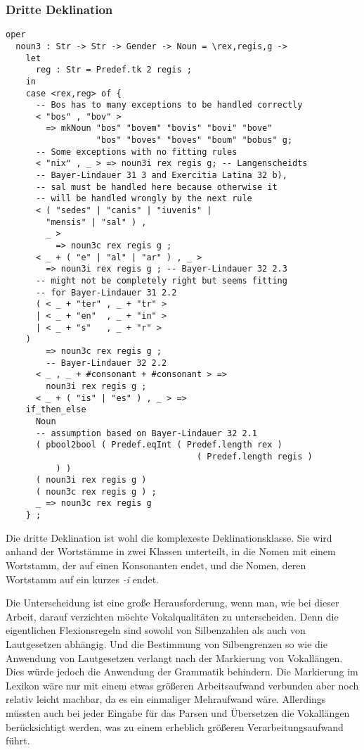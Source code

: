 \subsubsection{Dritte Deklination}
\begin{lstlisting}[float=h!tp,caption={Funktion zur Zuordnung von Nomen zu den Stämmen der dritten Deklination (vgl. \textbf{MorphoLat.gf})},label={GF-Morpho-Noun3},basicstyle=\small]
oper
  noun3 : Str -> Str -> Gender -> Noun = \rex,regis,g ->
    let
      reg : Str = Predef.tk 2 regis ;
    in
    case <rex,reg> of {
      -- Bos has to many exceptions to be handled correctly
      < "bos" , "bov" > 
        => mkNoun "bos" "bovem" "bovis" "bovi" "bove" 
                  "bos" "boves" "boves" "boum" "bobus" g;
      -- Some exceptions with no fitting rules
      < "nix" , _ > => noun3i rex regis g; -- Langenscheidts
      -- Bayer-Lindauer 31 3 and Exercitia Latina 32 b), 
      -- sal must be handled here because otherwise it 
      -- will be handled wrongly by the next rule 
      < ( "sedes" | "canis" | "iuvenis" |
        "mensis" | "sal" ) , 
        _ >
          => noun3c rex regis g ;  
      < _ + ( "e" | "al" | "ar" ) , _ > 
        => noun3i rex regis g ; -- Bayer-Lindauer 32 2.3
      -- might not be completely right but seems fitting
      -- for Bayer-Lindauer 31 2.2 
      ( < _ + "ter" , _ + "tr" >
      | < _ + "en"  , _ + "in" >
      | < _ + "s"   , _ + "r" > 
	) 
        => noun3c rex regis g ; 
        -- Bayer-Lindauer 32 2.2
      < _ , _ + #consonant + #consonant > => 
        noun3i rex regis g ; 
      < _ + ( "is" | "es" ) , _ > => 
	if_then_else 
	  Noun 
	  -- assumption based on Bayer-Lindauer 32 2.1
	  ( pbool2bool ( Predef.eqInt ( Predef.length rex ) 
                                      ( Predef.length regis ) 
          ) ) 
	  ( noun3i rex regis g ) 
	  ( noun3c rex regis g ) ;
      _ => noun3c rex regis g
    } ;
\end{lstlisting}
Die dritte Deklination ist wohl die komplexeste Deklinationsklasse. Sie wird anhand der Wortstämme in zwei Klassen unterteilt, in die Nomen mit einem Wortstamm, der auf einen Konsonanten endet, und die Nomen, deren Wortstamm auf ein kurzes \textit{-ǐ} endet. \par
Die Unterscheidung ist eine große Herausforderung, wenn man, wie bei dieser Arbeit, darauf verzichten möchte Vokalqualitäten zu unterscheiden. Denn die eigentlichen Flexionsregeln sind sowohl von Silbenzahlen als auch von Lautgesetzen abhängig. Und die Bestimmung von Silbengrenzen so wie die Anwendung von Lautgesetzen verlangt nach der Markierung von Vokallängen. Dies würde jedoch die Anwendung der Grammatik behindern. Die Markierung im Lexikon wäre nur mit einem etwas größeren Arbeitsaufwand verbunden aber noch relativ leicht machbar, da es ein einmaliger Mehraufwand wäre. Allerdings müssten auch bei jeder Eingabe für das Parsen und Übersetzen die Vokallängen berücksichtigt werden, was zu einem erheblich größeren Verarbeitungsaufwand führt. \par
